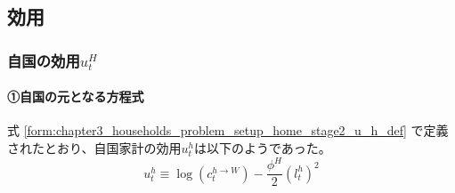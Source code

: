 
\subsection{効用}
\label{sec:chapter3_representative_household_utility}

\subsubsection{自国の効用\(u_t^H\)}
\label{sec:chapter3_representative_household_utility_home}

\paragraph{①自国の元となる方程式}
\label{sec:chapter3_representative_household_utility_home_original}
式
\eqref{form:chapter3_households_problem_setup_home_stage2_u_h_def}
で定義されたとおり、自国家計の効用\(u_t^h\)は以下のようであった。
\begin{equation}
\label{form:utility_home_original_u_h_def}
    u_t^h\equiv\log(c_t^{h\to W})-\frac{\phi^H}{2}(l_t^h)^2
\end{equation}

